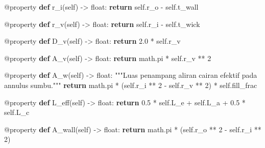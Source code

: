 \documentclass[
  indonesian,
  12pt,
  a4paper,
]{report}
\newenvironment{Shaded}{\begin{snugshade}}{\end{snugshade}}
\newcommand{\AttributeTok}[1]{\textcolor[rgb]{0.40,0.45,0.13}{#1}}
\newcommand{\BuiltInTok}[1]{\textcolor[rgb]{0.00,0.23,0.31}{#1}}
\newcommand{\CommentTok}[1]{\textcolor[rgb]{0.37,0.37,0.37}{#1}}
\newcommand{\ControlFlowTok}[1]{\textcolor[rgb]{0.00,0.23,0.31}{\textbf{#1}}}
\newcommand{\DecValTok}[1]{\textcolor[rgb]{0.68,0.00,0.00}{#1}}
\newcommand{\FloatTok}[1]{\textcolor[rgb]{0.68,0.00,0.00}{#1}}
\newcommand{\KeywordTok}[1]{\textcolor[rgb]{0.00,0.23,0.31}{\textbf{#1}}}
\newcommand{\NormalTok}[1]{\textcolor[rgb]{0.00,0.23,0.31}{#1}}
\newcommand{\OperatorTok}[1]{\textcolor[rgb]{0.37,0.37,0.37}{#1}}
\newcommand{\VariableTok}[1]{\textcolor[rgb]{0.07,0.07,0.07}{#1}}
\begin{document}
\begin{Shaded}
\begin{Highlighting}[]
    \AttributeTok{@property}
    \KeywordTok{def}\NormalTok{ r\_i(}\VariableTok{self}\NormalTok{) }\OperatorTok{{-}\textgreater{}} \BuiltInTok{float}\NormalTok{:}
        \ControlFlowTok{return} \VariableTok{self}\NormalTok{.r\_o }\OperatorTok{{-}} \VariableTok{self}\NormalTok{.t\_wall}

    \AttributeTok{@property}
    \KeywordTok{def}\NormalTok{ r\_v(}\VariableTok{self}\NormalTok{) }\OperatorTok{{-}\textgreater{}} \BuiltInTok{float}\NormalTok{:}
        \ControlFlowTok{return} \VariableTok{self}\NormalTok{.r\_i }\OperatorTok{{-}} \VariableTok{self}\NormalTok{.t\_wick}

    \AttributeTok{@property}
    \KeywordTok{def}\NormalTok{ D\_v(}\VariableTok{self}\NormalTok{) }\OperatorTok{{-}\textgreater{}} \BuiltInTok{float}\NormalTok{:}
        \ControlFlowTok{return} \FloatTok{2.0} \OperatorTok{*} \VariableTok{self}\NormalTok{.r\_v}

    \AttributeTok{@property}
    \KeywordTok{def}\NormalTok{ A\_v(}\VariableTok{self}\NormalTok{) }\OperatorTok{{-}\textgreater{}} \BuiltInTok{float}\NormalTok{:}
        \ControlFlowTok{return}\NormalTok{ math.pi }\OperatorTok{*} \VariableTok{self}\NormalTok{.r\_v }\OperatorTok{**} \DecValTok{2}

    \AttributeTok{@property}
    \KeywordTok{def}\NormalTok{ A\_w(}\VariableTok{self}\NormalTok{) }\OperatorTok{{-}\textgreater{}} \BuiltInTok{float}\NormalTok{:}
        \CommentTok{"""Luas penampang aliran cairan efektif pada annulus sumbu."""}
        \ControlFlowTok{return}\NormalTok{ math.pi }\OperatorTok{*}\NormalTok{ (}\VariableTok{self}\NormalTok{.r\_i }\OperatorTok{**} \DecValTok{2} \OperatorTok{{-}} \VariableTok{self}\NormalTok{.r\_v }\OperatorTok{**} \DecValTok{2}\NormalTok{) }\OperatorTok{*} \VariableTok{self}\NormalTok{.fill\_frac}

    \AttributeTok{@property}
    \KeywordTok{def}\NormalTok{ L\_eff(}\VariableTok{self}\NormalTok{) }\OperatorTok{{-}\textgreater{}} \BuiltInTok{float}\NormalTok{:}
        \ControlFlowTok{return} \FloatTok{0.5} \OperatorTok{*} \VariableTok{self}\NormalTok{.L\_e }\OperatorTok{+} \VariableTok{self}\NormalTok{.L\_a }\OperatorTok{+} \FloatTok{0.5} \OperatorTok{*} \VariableTok{self}\NormalTok{.L\_c}

    \AttributeTok{@property}
    \KeywordTok{def}\NormalTok{ A\_wall(}\VariableTok{self}\NormalTok{) }\OperatorTok{{-}\textgreater{}} \BuiltInTok{float}\NormalTok{:}
        \ControlFlowTok{return}\NormalTok{ math.pi }\OperatorTok{*}\NormalTok{ (}\VariableTok{self}\NormalTok{.r\_o }\OperatorTok{**} \DecValTok{2} \OperatorTok{{-}} \VariableTok{self}\NormalTok{.r\_i }\OperatorTok{**} \DecValTok{2}\NormalTok{)}


\end{Highlighting}
\end{Shaded}
\end{document}
